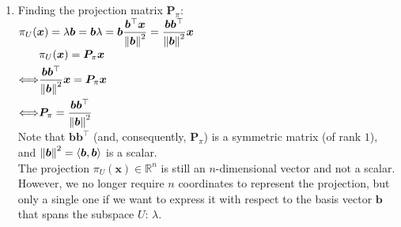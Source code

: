 \begin{enumerate}
\begin{enumerate}
        \item Finding the projection matrix $\bm{P}_\pi$:
        \hfill \cite{mfml/book/mml/Deisenroth-Faisal-Ong}
        \\
        $
            \pi _U (\bm{x})
            = \lambda \bm{b}
            = \bm{b} \lambda
            = \bm{b} \dfrac{\bm{b}^\top \bm{x}}{\left\| \bm{b} \right\|^2}
            = \dfrac{\bm{b}  \bm{b}^\top }{\left\| \bm{b} \right\|^2} \bm{x}
        $
        \\
        $
            \begin{aligned}
                & \pi _U (\bm{x}) = \bm{P}_\pi \bm{x} 
                \\
                \Longleftrightarrow &
                \dfrac{\bm{b}  \bm{b}^\top }{\left\| \bm{b} \right\|^2} \bm{x} = \bm{P}_\pi \bm{x} 
                \\
                \Longleftrightarrow &
                \bm{P}_\pi = \dfrac{\bm{b}  \bm{b}^\top }{\left\| \bm{b} \right\|^2}
            \end{aligned}
        $
        \\[0.2cm]
        Note that $\bm{bb}^\top$ (and, consequently, $\bm{P} _\pi$) is a symmetric matrix (of rank $1$), and $\left\| \bm{b} \right\| ^2 = \langle\bm{b}, \bm{b}\rangle$ is a scalar.\\
        The projection $\pi_U (\bm{x}) \in \mathbb{R}^n$ is still an $n$-dimensional vector and not a scalar. 
        However, we no longer require $n$ coordinates to represent the projection, but only a single one if we want to express it with respect to the basis vector $\bm{b}$ that spans the subspace $U$: $\lambda$.
        \hfill \cite{mfml/book/mml/Deisenroth-Faisal-Ong}
    \end{enumerate}
\end{enumerate}



